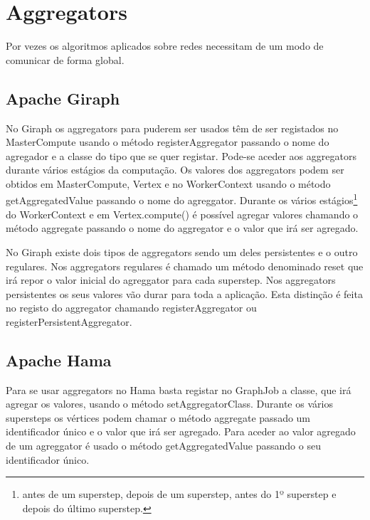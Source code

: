\newpage

\section{Aggregators}
  Por vezes os algoritmos aplicados sobre redes necessitam de um modo de comunicar de forma global. 
  \subsection*{Apache Giraph}
    No Giraph os aggregators para puderem ser usados têm de ser registados no MasterCompute usando o método registerAggregator
    passando o nome do agregador e a classe do tipo que se quer registar. Pode-se aceder aos aggregators durante vários estágios da computação.
    Os valores dos aggregators podem ser obtidos em MasterCompute, Vertex e no WorkerContext usando o método getAggregatedValue passando
    o nome do agreggator.
    Durante os vários estágios\footnote{antes de um superstep, depois de um superstep, 
    antes do 1º superstep e depois do último superstep.} do WorkerContext e em Vertex.compute() é possível agregar valores chamando o método
    aggregate passando o nome do aggregator e o valor que irá ser agregado.
    
    No Giraph existe dois tipos de aggregators sendo um deles persistentes e o outro regulares. Nos aggregators regulares é chamado um método
    denominado reset que irá repor o valor inicial do agreggator para cada superstep. Nos aggregators persistentes os seus valores vão durar
    para toda a aplicação. Esta distinção é feita no registo do aggregator chamando registerAggregator 
    ou registerPersistentAggregator.
    
  \subsection*{Apache Hama}
    Para se usar aggregators no Hama basta registar no GraphJob a classe, que irá agregar os valores, usando o método
    setAggregatorClass. Durante os vários supersteps os vértices podem chamar o método aggregate passado um identificador único
    e o valor que irá ser agregado. Para aceder ao valor agregado de um agreggator é usado o método getAggregatedValue passando o seu 
    identificador único.
    

